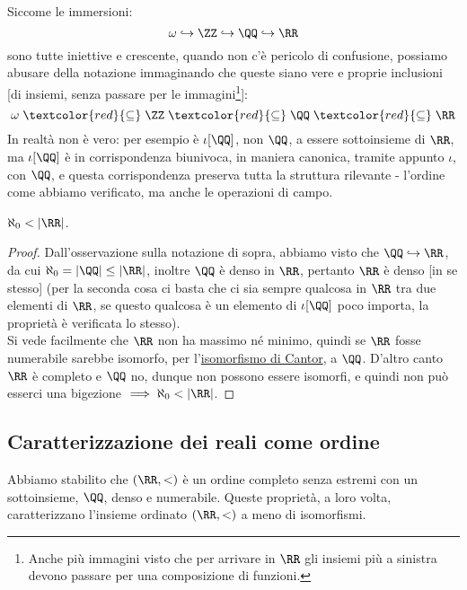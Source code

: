 \documentclass[11pt]{scrartcl}
\begin{document}
\begin{notation}
	Siccome le immersioni:
	\[ \omega \hookrightarrow \ZZ \hookrightarrow \QQ \hookrightarrow \RR
		\]
	sono tutte iniettive e crescente, quando non c'è pericolo di confusione, possiamo abusare della notazione immaginando che 
	queste siano vere e proprie inclusioni [di insiemi, senza passare per le immagini\footnote{Anche più immagini visto che per
	arrivare in $\RR$ gli insiemi più a sinistra devono passare per una composizione di funzioni.}]:
	\[ \omega \;\textcolor{red}{\subseteq}\; \ZZ \;\textcolor{red}{\subseteq} \;\QQ \;\textcolor{red}{\subseteq}\; \RR
		\]
	In realtà non è vero: per esempio è $\iota[\QQ]$, non $\QQ$, a essere sottoinsieme di $\RR$, ma $\iota[\QQ]$ è in corrispondenza biunivoca, in maniera 
	canonica, tramite appunto $\iota$, con $\QQ$, e questa corrispondenza preserva tutta la struttura rilevante - l'ordine come abbiamo verificato, ma anche le 
	operazioni di campo.
\end{notation}

\begin{corollary}
	$\aleph_0 < |\RR|$.
\end{corollary}

\begin{proof}
	Dall'osservazione sulla notazione di sopra, abbiamo visto che $\QQ \hookrightarrow \RR$, da cui $\aleph_0 = |\QQ| \leq |\RR|$, inoltre $\QQ$ è denso in $\RR$, pertanto 
	$\RR$ è denso [in se stesso] (per la seconda cosa ci basta che ci sia sempre qualcosa in $\RR$ tra due elementi di $\RR$, se questo qualcosa è un elemento di $\iota[\QQ]$ poco importa,
	la proprietà è verificata lo stesso).\\ Si vede facilmente che $\RR$ non ha massimo né minimo, quindi se $\RR$ fosse numerabile sarebbe isomorfo, per l'\hyperref[isoCantor]{isomorfismo di Cantor},
	a $\QQ$. D'altro canto $\RR$ è completo e $\QQ$ no, dunque non possono essere isomorfi, e quindi non può esserci una bigezione $\implies \aleph_0 < |\RR|$.
\end{proof}

\subsection{Caratterizzazione dei reali come ordine}
Abbiamo stabilito che $(\RR,<)$ è un ordine completo senza estremi con un sottoinsieme, $\QQ$, denso e numerabile.
Queste proprietà, a loro volta, caratterizzano l'insieme ordinato $(\RR,<)$ a meno di isomorfismi.
\end{document}
